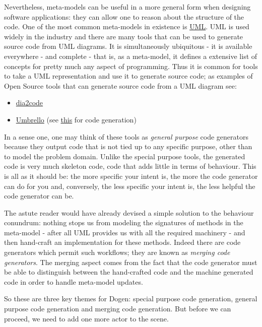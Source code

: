\documentclass[11pt]{article}
\begin{document}
Nevertheless, meta-models can be useful in a more general form when
designing software applications: they can allow one to reason about
the structure of the code. One of the most common meta-models in
existence is \href{http://en.wikipedia.org/wiki/Unified_Modeling_Language}{UML}. UML is used widely in the industry and there are
many tools that can be used to generate source code from UML
diagrams. It is simultaneously ubiquitous - it is available
everywhere - and complete - that is, as a meta-model, it defines a
extensive list of concepts for pretty much any aspect of
programming. Thus it is common for tools to take a UML representation
and use it to generate source code; as examples of Open Source tools
that can generate source code from a UML diagram see:

\begin{itemize}
\item \href{http://dia2code.sourceforge.net/}{dia2code}
\item \href{http://umbrello.kde.org/}{Umbrello} (see \href{http://docs.kde.org/development/en/kdesdk/umbrello/code-import-generation.html}{this} for code generation)
\end{itemize}


In a sense one, one may think of these tools as \emph{general purpose} code
generators because they output code that is not tied up to any
specific purpose, other than to model the problem domain. Unlike the
special purpose tools, the generated code is very much skeleton code,
code that adds little in terms of behaviour. This is all as it should
be: the more specific your intent is, the more the code generator can
do for you and, conversely, the less specific your intent is, the less
helpful the code generator can be.

The astute reader would have already devised a simple solution to the
behaviour conundrum: nothing stops us from modeling the signatures of
methods in the meta-model - after all UML provides us with all the
required machinery - and then hand-craft an implementation for these
methods. Indeed there are code generators which permit such workflows;
they are known as \emph{merging code generators}. The merging aspect comes
from the fact that the code generator must be able to distinguish
between the hand-crafted code and the machine generated code in order
to handle meta-model updates.

So these are three key themes for Dogen: special purpose code
generation, general purpose code generation and merging code
generation. But before we can proceed, we need to add one more actor
to the scene.
\end{document}
